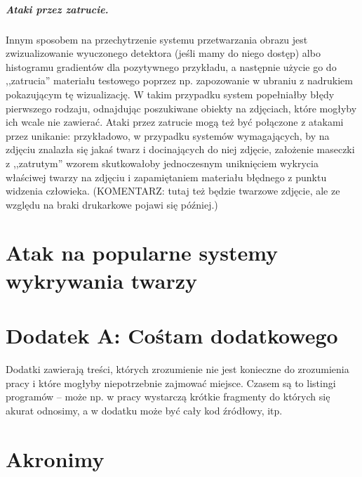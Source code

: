 \documentclass[12pt,a4paper,leqno,oneside,titlepage]{book}
\begin{document}
\paragraph{Ataki przez zatrucie.}
Innym sposobem na przechytrzenie systemu przetwarzania obrazu jest zwizualizowanie wyuczonego detektora (jeśli mamy do niego dostęp) albo histogramu gradientów dla pozytywnego przykładu, a następnie użycie go do ,,zatrucia'' materiału testowego poprzez np. zapozowanie w ubraniu z nadrukiem pokazującym tę wizualizację. W takim przypadku system popełniałby błędy pierwszego rodzaju, odnajdując poszukiwane obiekty na zdjęciach, które mogłyby ich wcale nie zawierać. Ataki przez zatrucie mogą też być połączone z atakami przez unikanie: przykładowo, w przypadku systemów wymagających, by na zdjęciu znalazła się jakaś twarz i docinających do niej zdjęcie, założenie maseczki z ,,zatrutym'' wzorem skutkowałoby jednoczesnym uniknięciem wykrycia właściwej twarzy na zdjęciu i zapamiętaniem materiału błędnego z punktu widzenia człowieka\cite{MacDonald19}. (KOMENTARZ: tutaj też będzie twarzowe zdjęcie, ale ze względu na braki drukarkowe pojawi się później.)

%
%
%
%
%
%
%
%
%
%

\chapter{Atak na popularne systemy wykrywania twarzy}

\newpage



\appendix
{}

\chapter*{Dodatek A: Cośtam dodatkowego}

Dodatki zawierają treści, których zrozumienie nie jest konieczne do zrozumienia pracy i które mogłyby niepotrzebnie zajmować miejsce. Czasem są to listingi programów -- może np. w pracy wystarczą krótkie fragmenty do których się akurat odnosimy, a w dodatku może być cały kod źródłowy, itp.

\chapter*{Akronimy}
\begin{acronym}
\end{acronym}
\end{document}
